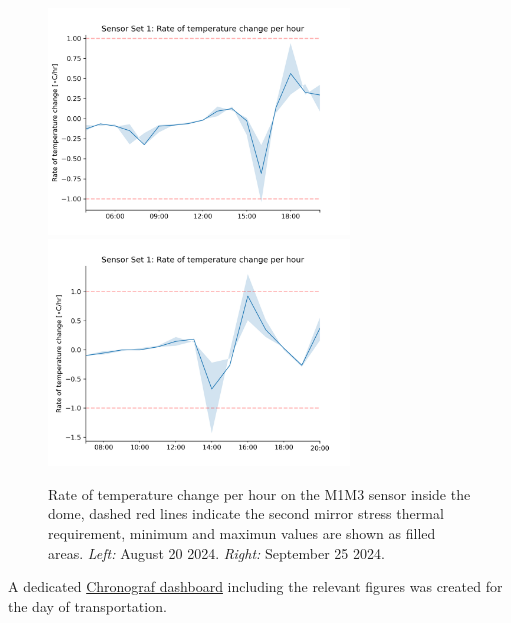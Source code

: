 \documentclass[SE,lsstdraft,authoryear,toc]{lsstdoc}
\begin{document}
\begin{figure}[h!]
  \includegraphics[width=8cm]{SITCOMTN-141_figures/Sensor1_1h_temp_derivative_e1.png}
  \includegraphics[width=8cm]{SITCOMTN-141_figures/Sensor1_1h_temp_derivative_e2.png}
  \caption{Rate of temperature change per hour on the M1M3 sensor inside the dome, dashed red lines indicate the second mirror stress thermal requirement, minimum and maximun values are shown as filled areas. \textit{Left:} August 20 2024. \textit{Right:} September 25 2024.}
  \label{fig_set1_derivative_events}
\end{figure}

A dedicated \href{https://summit-lsp.lsst.codes/chronograf/sources/1/dashboards/349?refresh=Paused&lower=2024-09-21T03%3A00%3A00.000Z&upper=2024-09-23T03%3A00%3A00.000Z}{Chronograf dashboard} including the relevant figures was created for the day of transportation.
\end{document}
